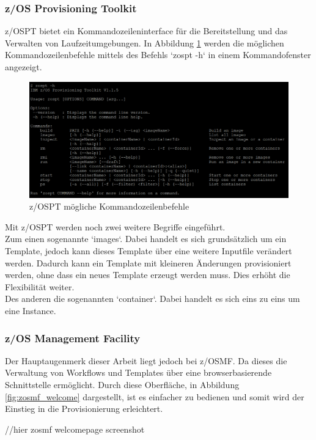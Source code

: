 \subsubsection{z/OS Provisioning Toolkit}\label{sssec:zospt}
z/OSPT bietet ein Kommandozeileninterface für die Bereitstellung und das Verwalten von Laufzeitumgebungen.
In Abbildung \ref{fig:zospt_help} werden die möglichen Kommandozeilenbefehle mittels des Befehls `zospt -h` in einem Kommandofenster angezeigt.
\begin{figure}[h]
	\centering
	\includegraphics[width=\textwidth]{figures/zospt_help_putty.png}
	\caption{z/OSPT mögliche Kommandozeilenbefehle}
	\label{fig:zospt_help}
\end{figure}
Mit z/OSPT werden noch zwei weitere Begriffe eingeführt.\\
Zum einen sogenannte `images`.
Dabei handelt es sich grundsätzlich um ein Template, jedoch kann dieses Template über eine weitere Inputfile verändert werden.
Dadurch kann ein Template mit kleineren Änderungen provisioniert werden, ohne dass ein neues Template erzeugt werden muss.
Dies erhöht die Flexibilität weiter.\\
Des anderen die sogenannten `container`.
Dabei handelt es sich eins zu eins um eine Instance.
\cite{IBM.2019b}

\subsubsection{z/OS Management Facility}\label{sssec:zosmf}
Der Hauptaugenmerk dieser Arbeit liegt jedoch bei z/OSMF.
Da dieses die Verwaltung von Workflows und Templates über eine browserbasierende Schnittstelle ermöglicht.
Durch diese Oberfläche, in Abbildung \ref{fig:zosmf_welcome} dargestellt, ist es einfacher zu bedienen und somit wird der Einstieg in die Provisionierung erleichtert.

//hier zosmf welcomepage screenshot

